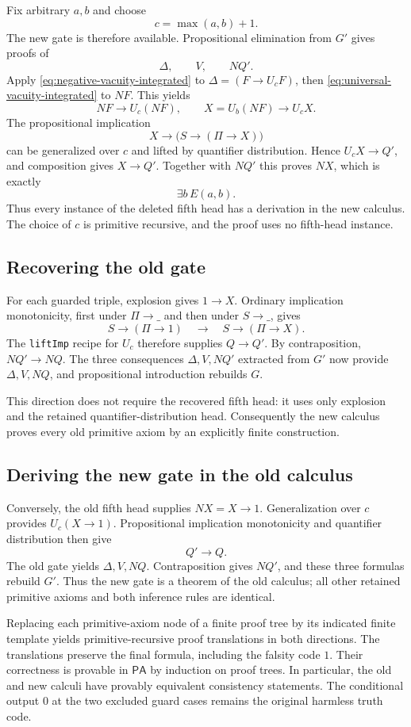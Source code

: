 Fix arbitrary $a,b$ and choose
\[
 c=\max(a,b)+1.
\]
The new gate is therefore available.  Propositional elimination from $G'$
gives proofs of
\[
 \Delta,\qquad V,\qquad NQ'.
\]
Apply \eqref{eq:negative-vacuity-integrated} to
$\Delta=(F\to U_cF)$, then
\eqref{eq:universal-vacuity-integrated} to $NF$.  This yields
\[
 NF\to U_c(NF),\qquad X=U_b(NF)\to U_cX.
\]
The propositional implication
\[
 X\to\bigl(S\to(\Pi\to X)\bigr)
\]
can be generalized over $c$ and lifted by quantifier distribution.  Hence
$U_cX\to Q'$, and composition gives $X\to Q'$.  Together with $NQ'$ this
proves $NX$, which is exactly
\[
 \exists b\,E(a,b).
\]
Thus every instance of the deleted fifth head has a derivation in the new
calculus.  The choice of $c$ is primitive recursive, and the proof uses no
fifth-head instance.

\subsection{Recovering the old gate}

For each guarded triple, explosion gives $1\to X$.  Ordinary implication
monotonicity, first under $\Pi\to\_$ and then under $S\to\_$, gives
\[
 S\to(\Pi\to1)\quad\longrightarrow\quad S\to(\Pi\to X).
\]
The \texttt{liftImp} recipe for $U_c$ therefore supplies $Q\to Q'$.  By
contraposition, $NQ'\to NQ$.  The three consequences
$\Delta,V,NQ'$ extracted from $G'$ now provide $\Delta,V,NQ$, and
propositional introduction rebuilds $G$.

This direction does not require the recovered fifth head: it uses only
explosion and the retained quantifier-distribution head.  Consequently the
new calculus proves every old primitive axiom by an explicitly finite
construction.

\subsection{Deriving the new gate in the old calculus}

Conversely, the old fifth head supplies $NX=X\to1$.  Generalization over $c$
provides $U_c(X\to1)$.  Propositional implication monotonicity and quantifier
distribution then give
\[
 Q'\to Q.
\]
The old gate yields $\Delta,V,NQ$.  Contraposition gives $NQ'$, and these three
formulas rebuild $G'$.  Thus the new gate is a theorem of the old calculus;
all other retained primitive axioms and both inference rules are identical.

Replacing each primitive-axiom node of a finite proof tree by its indicated
finite template yields primitive-recursive proof translations in both
directions.  The translations preserve the final formula, including the
falsity code $1$.  Their correctness is provable in $\mathsf{PA}$ by induction
on proof trees.  In particular, the old and new calculi have provably
equivalent consistency statements.  The conditional output $0$ at the two
excluded guard cases remains the original harmless truth code.

